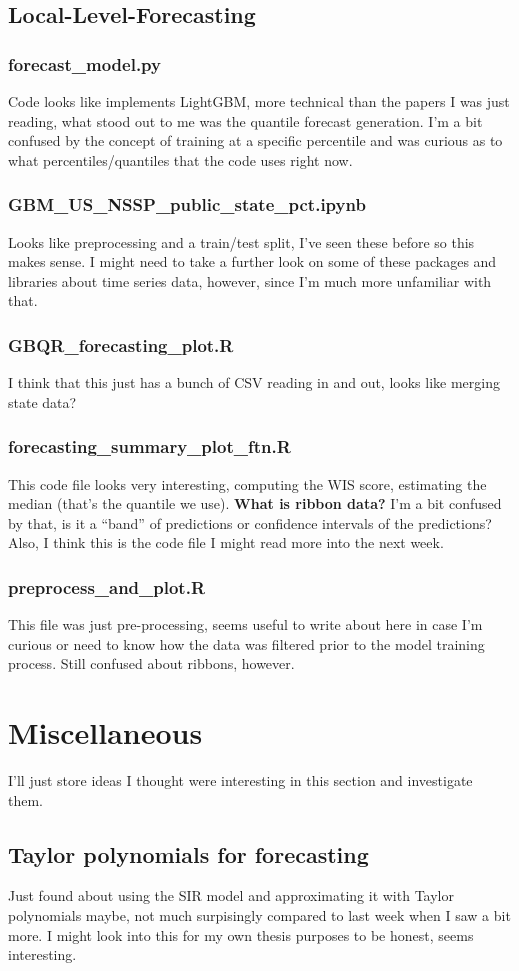 \documentclass[12pt]{article}
\begin{document}
\subsection{Local-Level-Forecasting}
\subsubsection{forecast\_model.py}
Code looks like implements LightGBM, more technical than the papers I was just reading, what stood out to me was the quantile forecast generation. I'm a bit confused by the concept of training at a specific percentile and was curious as to what percentiles/quantiles that the code uses right now. 
\subsubsection{GBM\_US\_NSSP\_public\_state\_pct.ipynb}
Looks like preprocessing and a train/test split, I've seen these before so this makes sense. I might need to take a further look on some of these packages and libraries about time series data, however, since I'm much more unfamiliar with that.
\subsubsection{GBQR\_forecasting\_plot.R}
I think that this just has a bunch of CSV reading in and out, looks like merging state data?
\subsubsection{forecasting\_summary\_plot\_ftn.R}
This code file looks very interesting, computing the WIS score, estimating the median (that's the quantile we use). \textbf{What is ribbon data?} I'm a bit confused by that, is it a ``band'' of predictions or confidence intervals of the predictions? Also, I think this is the code file I might read more into the next week.
\subsubsection{preprocess\_and\_plot.R}
This file was just pre-processing, seems useful to write about here in case I'm curious or need to know how the data was filtered prior to the model training process. Still confused about ribbons, however.

\section{Miscellaneous}
I'll just store ideas I thought were interesting in this section and investigate them.
\subsection{Taylor polynomials for forecasting}
Just found about using the SIR model and approximating it with Taylor polynomials maybe, not much surpisingly compared to last week when I saw a bit more. I might look into this for my own thesis purposes to be honest, seems interesting. 


\printbibliography
\end{document}
